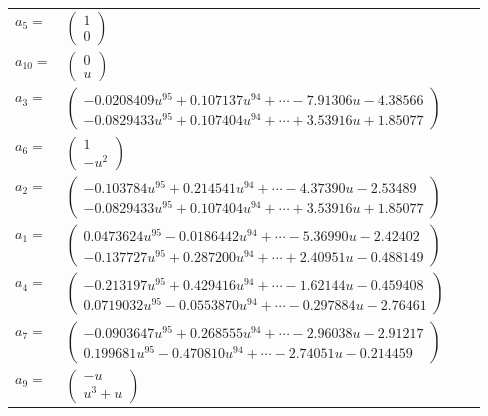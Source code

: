 \documentclass[1p]{elsarticle_modified}
\theoremstyle{definition}
\begin{document}
\begin{tabular}{m{7pt} m{180pt} m{7pt} m{180pt} }
\flushright $a_{5}=$&$\begin{pmatrix}1\\0\end{pmatrix}$ \\
\flushright $a_{10}=$&$\begin{pmatrix}0\\u\end{pmatrix}$ \\
\flushright $a_{3}=$&$\begin{pmatrix}-0.0208409 u^{95}+0.107137 u^{94}+\cdots-7.91306 u-4.38566\\-0.0829433 u^{95}+0.107404 u^{94}+\cdots+3.53916 u+1.85077\end{pmatrix}$ \\
\flushright $a_{6}=$&$\begin{pmatrix}1\\- u^2\end{pmatrix}$ \\
\flushright $a_{2}=$&$\begin{pmatrix}-0.103784 u^{95}+0.214541 u^{94}+\cdots-4.37390 u-2.53489\\-0.0829433 u^{95}+0.107404 u^{94}+\cdots+3.53916 u+1.85077\end{pmatrix}$ \\
\flushright $a_{1}=$&$\begin{pmatrix}0.0473624 u^{95}-0.0186442 u^{94}+\cdots-5.36990 u-2.42402\\-0.137727 u^{95}+0.287200 u^{94}+\cdots+2.40951 u-0.488149\end{pmatrix}$ \\
\flushright $a_{4}=$&$\begin{pmatrix}-0.213197 u^{95}+0.429416 u^{94}+\cdots-1.62144 u-0.459408\\0.0719032 u^{95}-0.0553870 u^{94}+\cdots-0.297884 u-2.76461\end{pmatrix}$ \\
\flushright $a_{7}=$&$\begin{pmatrix}-0.0903647 u^{95}+0.268555 u^{94}+\cdots-2.96038 u-2.91217\\0.199681 u^{95}-0.470810 u^{94}+\cdots-2.74051 u-0.214459\end{pmatrix}$ \\
\flushright $a_{9}=$&$\begin{pmatrix}- u\\u^3+u\end{pmatrix}$ \\

\end{tabular}
\end{document}
